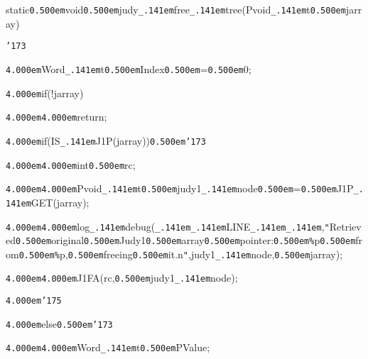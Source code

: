 \noindent
{}\hfill

\noindent
{}\hfill

\noindent
{}static{\tt\mc \kern0.500em}void{\tt\mc \kern0.500em}judy{\tt\_\kern.141em}free{\tt\_\kern.141em}tree(Pvoid{\tt\_\kern.141em}t{\tt\mc \kern0.500em}jarray)

\noindent
{}{\tt\char'173}

\noindent
{}{\tt\mc \kern4.000em}Word{\tt\_\kern.141em}t{\tt\mc \kern0.500em}Index{\tt\mc \kern0.500em}={\tt\mc \kern0.500em}0;

\noindent
{}\hfill

\noindent
{}{\tt\mc \kern4.000em}if(!jarray)

\noindent
{}{\tt\mc \kern4.000em}{\tt\mc \kern4.000em}return;

\noindent
{}\hfill

\noindent
{}{\tt\mc \kern4.000em}if(IS{\tt\_\kern.141em}J1P(jarray)){\tt\mc \kern0.500em}{\tt\char'173}

\noindent
{}{\tt\mc \kern4.000em}{\tt\mc \kern4.000em}int{\tt\mc \kern0.500em}rc;

\noindent
{}{\tt\mc \kern4.000em}{\tt\mc \kern4.000em}Pvoid{\tt\_\kern.141em}t{\tt\mc \kern0.500em}judy1{\tt\_\kern.141em}node{\tt\mc \kern0.500em}={\tt\mc \kern0.500em}J1P{\tt\_\kern.141em}GET(jarray);

\noindent
{}\hfill

\noindent
{}{\tt\mc \kern4.000em}{\tt\mc \kern4.000em}log{\tt\_\kern.141em}debug({\tt\_\kern.141em}{\tt\_\kern.141em}LINE{\tt\_\kern.141em}{\tt\_\kern.141em},{\tt "}Retrieved{\tt\mc \kern0.500em}original{\tt\mc \kern0.500em}Judy1{\tt\mc \kern0.500em}array{\tt\mc \kern0.500em}pointer:{\tt\mc \kern0.500em}{\tt\%}p{\tt\mc \kern0.500em}from{\tt\mc \kern0.500em}{\tt\%}p,{\tt\mc \kern0.500em}freeing{\tt\mc \kern0.500em}it.{\tt{}}n{\tt "},judy1{\tt\_\kern.141em}node,{\tt\mc \kern0.500em}jarray);

\noindent
{}\hfill

\noindent
{}{\tt\mc \kern4.000em}{\tt\mc \kern4.000em}J1FA(rc,{\tt\mc \kern0.500em}judy1{\tt\_\kern.141em}node);

\noindent
{}{\tt\mc \kern4.000em}{\tt\char'175}

\noindent
{}{\tt\mc \kern4.000em}else{\tt\mc \kern0.500em}{\tt\char'173}

\noindent
{}{\tt\mc \kern4.000em}{\tt\mc \kern4.000em}Word{\tt\_\kern.141em}t{\tt\mc \kern0.500em}{\tt *}PValue;

\noindent
{}\hfill

